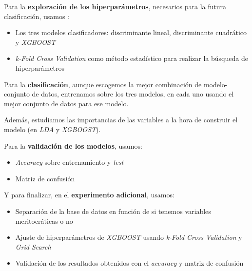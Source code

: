 Para la \textbf{exploración de los hiperparámetros}, necesarios para la futura clasificación, usamos \footnotemark:


\begin{itemize}
    \item Los tres modelos clasificadores: discriminante lineal, discriminante cuadrático y \textit{XGBOOST}
    \item \textit{k-Fold Cross Validation} como método estadístico para realizar la búsqueda de hiperparámetros
\end{itemize}

Para la \textbf{clasificación}, aunque escogemos la mejor combinación de modelo-conjunto de datos, entrenamos sobre los tres modelos, en cada uno usando el mejor conjunto de datos para ese modelo.

Además, estudiamos las importancias de las variables a la hora de construir el modelo (en \textit{LDA} y \textit{XGBOOST}).

Para la \textbf{validación de los modelos}, usamos:

\begin{itemize}
    \item \textit{Accuracy} sobre entrenamiento y \textit{test}
    \item Matriz de confusión
\end{itemize}

Y para finalizar, en el \textbf{experimento adicional}, usamos:

\begin{itemize}
    \item Separación de la base de datos en función de si tenemos variables meritocráticas o no
    \item Ajuste de hiperparámetros de \textit{XGBOOST} usando \textit{k-Fold Cross Validation} y \textit{Grid Search}
    \item Validación de los resultados obtenidos con el \textit{accuracy} y matriz de confusión
\end{itemize}


